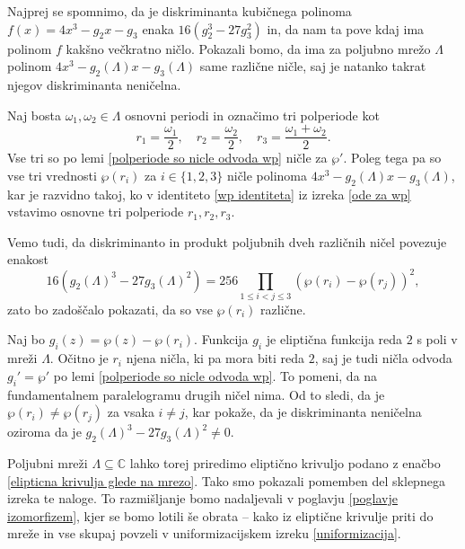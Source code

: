 \documentclass[mat1]{fmfdelo}
\newcommand{\C}{\mathbb C}
\newcommand{\om}{\omega}
\theoremstyle{definition}
\begin{document}
\begin{dokaz}
    Najprej se spomnimo, da je diskriminanta kubičnega polinoma $f(x) = 4x^3 - g_2 x - g_3$ enaka $16(g_2^3 - 27g_3^2)$ in, da nam ta pove kdaj ima polinom $f$ kakšno večkratno ničlo. Pokazali bomo, da ima za poljubno mrežo $\Lambda$ polinom $4x^3 - g_2(\Lambda) x - g_3(\Lambda)$ same različne ničle, saj je natanko takrat njegov diskriminanta neničelna.  

    Naj bosta $\om_1, \om_2 \in \Lambda$ osnovni periodi in označimo tri polperiode kot
    \[
        r_1 = \frac{\om_1}{2}, \quad r_2 = \frac{\om_2}{2}, \quad r_3 = \frac{\om_1 + \om_2}{2}.
    \]
    Vse tri so po lemi \ref{polperiode so nicle odvoda wp} ničle za $\wp'$. Poleg tega pa so vse tri vrednosti $\wp(r_i)$ za $i \in \{1,2,3\}$ ničle polinoma $4x^3 - g_2(\Lambda) x - g_3(\Lambda)$, kar je razvidno takoj, ko v identiteto \ref{wp identiteta} iz izreka \ref{ode za wp} vstavimo osnovne tri polperiode $r_1, r_2, r_3$.
    
    Vemo tudi, da diskriminanto in produkt poljubnih dveh različnih ničel povezuje enakost 
    \[
        16(g_2(\Lambda)^3 - 27g_3(\Lambda)^2) = 256\prod_{1 \leq i < j \leq 3}(\wp(r_i) - \wp(r_j))^2,  
    \]
    zato bo zadoščalo pokazati, da so vse $\wp(r_i)$ različne.
    
    Naj bo $g_i(z) = \wp(z) - \wp(r_i)$. Funkcija $g_i$ je eliptična funkcija reda $2$ s poli v mreži $\Lambda$. Očitno je $r_i$ njena ničla, ki pa mora biti reda $2$, saj je tudi ničla odvoda $g_i' = \wp'$ po lemi \ref{polperiode so nicle odvoda wp}. To pomeni, da na fundamentalnem paralelogramu drugih ničel nima. Od to sledi, da je $\wp(r_i) \neq \wp(r_j)$ za vsaka $i \neq j$, kar pokaže, da je diskriminanta neničelna oziroma da je $g_2(\Lambda)^3 - 27g_3(\Lambda)^2 \neq 0$. 
\end{dokaz}

Poljubni mreži $\Lambda \subseteq \C$ lahko torej priredimo eliptično krivuljo podano z enačbo \ref{elipticna krivulja glede na mrezo}. Tako smo pokazali pomemben del sklepnega izreka te naloge. To razmišljanje bomo nadaljevali v poglavju \ref{poglavje izomorfizem}, kjer se bomo lotili še obrata -- kako iz eliptične krivulje priti do mreže in vse skupaj povzeli v uniformizacijskem izreku \ref{uniformizacija}.

\break




\end{document}
